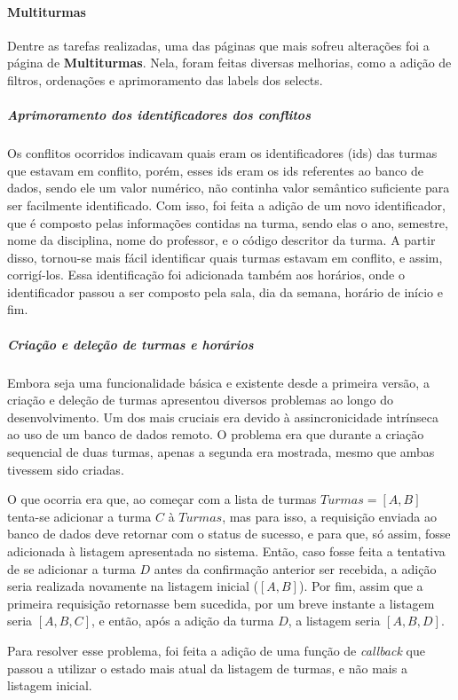 \paragraph*{Multiturmas}

Dentre as tarefas realizadas, uma das páginas que mais sofreu alterações foi a página de \textbf{Multiturmas}. Nela, foram feitas diversas melhorias, como a adição de filtros, ordenações e aprimoramento das labels dos selects.

\subparagraph*{Aprimoramento dos identificadores dos conflitos}

Os conflitos ocorridos indicavam quais eram os identificadores (ids) das turmas que estavam em conflito, porém, esses ids eram os ids referentes ao banco de dados, sendo ele um valor numérico, não continha valor semântico suficiente para ser facilmente identificado. Com isso, foi feita a adição de um novo identificador, que é composto pelas informações contidas na turma, sendo elas o ano, semestre, nome da disciplina, nome do professor, e o código descritor da turma. A partir disso, tornou-se mais fácil identificar quais turmas estavam em conflito, e assim, corrigí-los. Essa identificação foi adicionada também aos horários, onde o identificador passou a ser composto pela sala, dia da semana, horário de início e fim.

\subparagraph*{Criação e deleção de turmas e horários}

Embora seja uma funcionalidade básica e existente desde a primeira versão, a criação e deleção de turmas apresentou diversos problemas ao longo do desenvolvimento. Um dos mais cruciais era devido à assincronicidade intrínseca ao uso de um banco de dados remoto. O problema era que durante a criação sequencial de duas turmas, apenas a segunda era mostrada, mesmo que ambas tivessem sido criadas.

O que ocorria era que, ao começar com a lista de turmas $Turmas = [A, B]$ tenta-se adicionar a turma $C$ à $Turmas$, mas para isso, a requisição enviada ao banco de dados deve retornar com o status de sucesso, e para que, só assim, fosse adicionada à listagem apresentada no sistema. Então, caso fosse feita a tentativa de se adicionar a turma $D$ antes da confirmação anterior ser recebida, a adição seria realizada novamente na listagem inicial ($[A, B]$). Por fim, assim que a primeira requisição retornasse bem sucedida, por um breve instante a listagem seria $[A, B, C]$, e então, após a adição da turma $D$, a listagem seria $[A, B, D]$.

Para resolver esse problema, foi feita a adição de uma função de \textit{callback} que passou a utilizar o estado mais atual da listagem de turmas, e não mais a listagem inicial.

